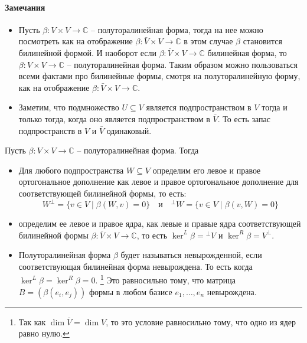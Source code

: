 \paragraph{Замечания}

\begin{itemize}
\item Пусть $\beta\colon V\times V\to \mathbb C$ -- полуторалинейная форма, тогда на нее можно посмотреть как на отображение $\beta\colon \bar V\times V\to \mathbb C$ в этом случае $\beta$ становится билинейной формой.
И наоборот если $\beta\colon \bar V\times V\to \mathbb C$ билинейная форма, то $\beta\colon V\times V\to \mathbb C$ -- полуторалинейная форма.
Таким образом можно пользоваться всеми фактами про билинейные формы, смотря на полуторалинейную форму, как на отображение $\beta\colon \bar V\times V\to \mathbb C$.

\item Заметим, что подмножество $U\subseteq V$ является подпространством в $V$ тогда и только тогда, когда оно является подпространством в $\bar V$.
То есть запас подпространств в $V$ и $\bar V$ одинаковый.
\end{itemize}

\begin{definition}
Пусть $\beta\colon V\times V\to \mathbb C$ -- полуторалинейная форма.
Тогда
\begin{itemize}
\item Для любого подпространства $W\subseteq V$ определим его левое и правое ортогональное дополнение как левое и правое ортогональное дополнение для соответствующей билинейной формы, то есть:
\[
W^\bot = \{v\in V\mid \beta(W,v) = 0\}\quad \text{и} \quad {}^\bot W = \{v\in V\mid \beta(v, W) = 0\}
\]

\item  определим ее левое и правое ядра, как левые и правые ядра соответствующей билинейной формы $\beta\colon \bar V\times V\to \mathbb C$, то есть $\ker^L \beta= {}^\bot V$ и $\ker^R \beta = V^\bot$.

\item Полуторалинейная форма $\beta$ будет называться невырожденной, если соответствующая билинейная форма невырождена.
То есть когда $\ker^L\beta = \ker ^R\beta = 0$.%
\footnote{Так как $\dim \bar V = \dim V$, то это условие равносильно тому, что одно из ядер равно нулю.}
Это равносильно тому, что матрица $B = (\beta(e_i, e_j))$ формы в любом базисе $e_1,\ldots,e_n$ невырождена.
\end{itemize}
\end{definition}

